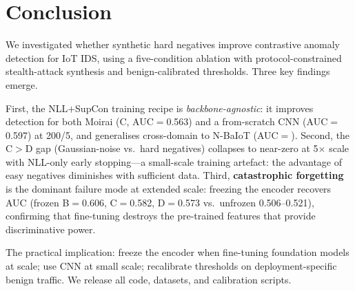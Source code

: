 \section{Conclusion}
\label{sec:conclusion}

We investigated whether synthetic hard negatives improve contrastive
anomaly detection for IoT IDS, using a five-condition ablation with
protocol-constrained stealth-attack synthesis and benign-calibrated thresholds.
Three key findings emerge.

First, the NLL$+$SupCon training recipe is \emph{backbone-agnostic}:
it improves detection for both Moirai (C, AUC$=$0.563) and a from-scratch
CNN (AUC$=$0.597) at 200/5, and generalises cross-domain to N-BaIoT
(AUC$=$\nbaiotAUC{}).
Second, the C$>$D gap (Gaussian-noise vs.\ hard negatives) collapses
to near-zero at 5$\times$ scale with NLL-only early stopping---a
small-scale training artefact: the advantage of easy negatives diminishes
with sufficient data.
Third, \textbf{catastrophic forgetting} is the dominant failure mode at
extended scale: freezing the encoder recovers AUC
(frozen B$=$0.606, C$=$0.582, D$=$0.573 vs.\ unfrozen 0.506--0.521),
confirming that fine-tuning destroys the pre-trained features that
provide discriminative power.

The practical implication: freeze the encoder when fine-tuning foundation
models at scale; use CNN at small scale; recalibrate thresholds on
deployment-specific benign traffic.
We release all code, datasets, and calibration scripts.
